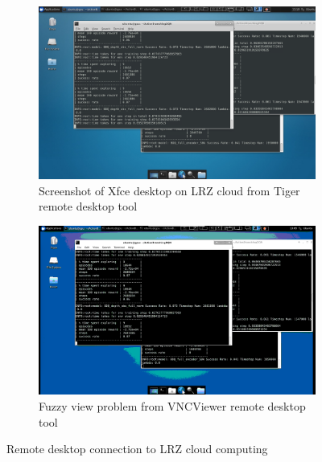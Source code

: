 \begin{figure}[htbp]
    \centering
    \begin{subfigure}{0.48\textwidth}
      \includegraphics[width=1\linewidth]{figures/tiger}
      \caption{ Screenshot of Xfce desktop on LRZ cloud from Tiger remote desktop tool} \label{fig:tiger}
    \end{subfigure}%
    \hspace*{\fill}   %
    \begin{subfigure}{0.48\textwidth}
      \includegraphics[width=1\linewidth]{figures/vncviewer}
      \caption{ Fuzzy view problem from VNCViewer remote desktop tool} \label{fig:vncviewer}
    \end{subfigure}%

\caption{ Remote desktop connection to LRZ cloud computing \label{fig:lrzcloud}}
\end{figure}